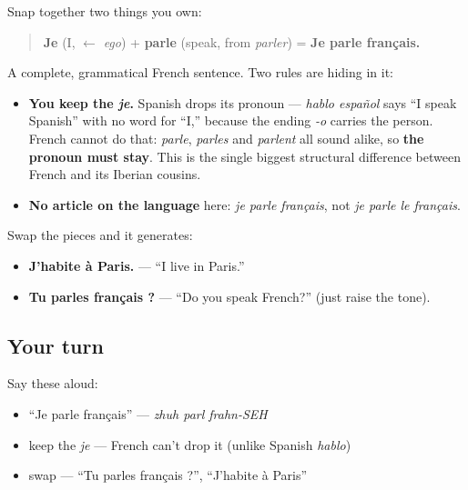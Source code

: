 \begin{grammarlens}[title={Grammar Lens: two rules hiding in four words}]
Snap together two things you own:

\begin{quote}
\textbf{Je} (I, $\leftarrow$ \emph{ego}) + \textbf{parle} (speak, from \emph{parler}) = \textbf{Je parle français.}
\end{quote}

A complete, grammatical French sentence. Two rules are hiding in it:

\begin{itemize}
\raggedright
  \item \textbf{You keep the \emph{je}.} Spanish drops its pronoun — \emph{hablo español} says \textquotedblleft{}I speak Spanish\textquotedblright{} with no word for \textquotedblleft{}I,\textquotedblright{} because the ending \emph{-o} carries the person. French cannot do that: \emph{parle}, \emph{parles} and \emph{parlent} all sound alike, so \textbf{the pronoun must stay}. This is the single biggest structural difference between French and its Iberian cousins.
  \item \textbf{No article on the language} here: \emph{je parle français}, not \emph{je parle le français}.
\end{itemize}

Swap the pieces and it generates:

\begin{itemize}
\raggedright
  \item \textbf{J'habite à Paris.} — \textquotedblleft{}I live in Paris.\textquotedblright{}
  \item \textbf{Tu parles français ?} — \textquotedblleft{}Do you speak French?\textquotedblright{} (just raise the tone).
\end{itemize}
\end{grammarlens}

\subsection*{Your turn}
Say these aloud:

\begin{itemize}
\raggedright
  \item \textquotedblleft{}Je parle français\textquotedblright{} — \emph{zhuh parl frahn-SEH}
  \item keep the \emph{je} — French can't drop it (unlike Spanish \emph{hablo})
  \item swap — \textquotedblleft{}Tu parles français ?\textquotedblright{}, \textquotedblleft{}J'habite à Paris\textquotedblright{}
\end{itemize}

